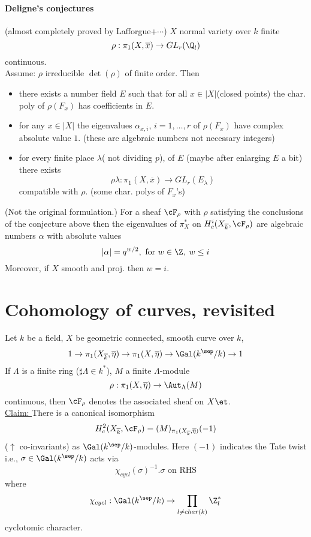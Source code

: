 \paragraph{Deligne's conjectures}(almost completely proved by Lafforgue+$\cdots$) $X$ normal variety over $k$ finite
	$$\rho: \pi_1(X, \overline x)\to GL_r(\Q_l) $$
	continuous.\\
Assume: $\rho$ irreducible $\det(\rho)$ of finite order. Then 
	\begin{itemize}
	\item there exists a number field $E$ such that for all $x\in |X|$(closed points) the char. poly of $\rho(F_x)$ has coefficients in $E$. 
	\item for any $x\in |X|$ the eigenvalues $\alpha_{x, i}$, $i=1, \ldots, r$ of $\rho(F_x)$ have complex absolute value $1$. 
	(these are algebraic numbers not necessary integers)
	\item for every finite place $\lambda$( not dividing $p$), of $E$ (maybe after enlarging $E$ a bit) there exists 
	$$\rho\lambda: \pi_1(X, \overline x) \to GL_r(E_\lambda)$$
	compatible with $\rho$. (some char. polys of  $F_x$'s)
	\end{itemize}

\begin{thm} (Not the original formulation.) For a sheaf $\cF_\rho$ with $\rho$ satisfying the conclusions of the conjecture above then the eigenvalues of $\pi_X^*$ on $H_c^i(X_{\overline k}, \cF_{\rho})$ are algebraic numbers $\alpha$ with absolute values
	$$|\alpha|=q^{w/2}, \text{ for }w\in \Z, \; w\leq i$$
	Moreover, if $X$ smooth and proj. then $w=i$.
\end{thm}



\section*{Cohomology of curves, revisited} 
Let $k$ be a field, $X$ be geometric connected, smooth curve over $k$, 
	$$1\to \pi_1(X_{\overline k}, \overline \eta)\to \pi_1(X, \overline\eta)\to \Gal(k^{\sep}/k)\to 1$$
If $\Lambda$ is a finite ring ($\sharp\Lambda\in k^*$), $M$ a finite $\Lambda$-module
	$$\rho:\pi_1(X, \overline\eta)\to \Aut_{\Lambda}(M)$$ continuous, 	then $\cF_\rho$ denotes the associated sheaf on $X\et$.\\
	
\noindent\underline{Claim: } There is a canonical isomorphism
	$$H_c^2(X_{\overline k}, \cF_\rho)=(M)_{\pi_1(X_{\overline k}, \overline\eta)}(-1)$$
	($\uparrow$ co-invariants) as $\Gal(k^{\sep}/k)$-modules. Here $(-1)$ indicates the Tate twist i.e., $\sigma\in \Gal(k^{\sep}/k)$ acts via
	$$\chi_{cycl}(\sigma)^{-1}.\sigma\text{ on RHS}$$
	where 
	$$\chi_{cycl}: \Gal(k^{\sep}/k)\to \prod_{l\neq char(k)}\Z_l^*$$
	cyclotomic character. 

